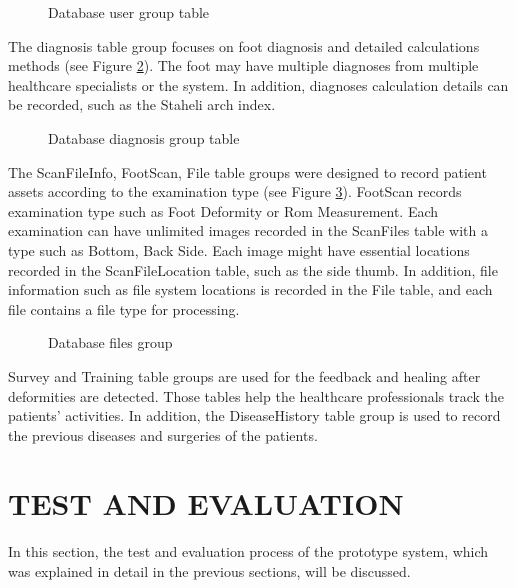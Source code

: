 \begin{figure}[htbp]
\centering
{}
\caption{Database user group table}
\label{fig:DatabaseUser}
\end{figure}

The diagnosis table group focuses on foot diagnosis and detailed calculations methods (see Figure \ref{fig:DatabaseDiagnosis}). The foot may have multiple diagnoses from multiple healthcare specialists or the system. In addition, diagnoses calculation details can be recorded, such as the Staheli arch index.

\begin{figure}[htbp]
\centering
{}
\caption{Database diagnosis group table}
\label{fig:DatabaseDiagnosis}
\end{figure}

The ScanFileInfo, FootScan, File table groups were designed to record patient assets according to the examination type (see Figure \ref{fig:DatabaseFiles}). FootScan records examination type such as Foot Deformity or Rom Measurement. Each examination can have unlimited images recorded in the ScanFiles table with a type such as Bottom, Back Side. Each image might have essential locations recorded in the ScanFileLocation table, such as the side thumb. In addition, file information such as file system locations is recorded in the File table, and each file contains a file type for processing.

\begin{figure}[htbp]
\centering
{}
\caption{Database files group}
\label{fig:DatabaseFiles}
\end{figure}

Survey and Training table groups are used for the feedback and healing after deformities are detected. Those tables help the healthcare professionals track the patients' activities. In addition, the DiseaseHistory table group is used to record the previous diseases and surgeries of the patients.

\section{TEST AND EVALUATION} \label{sec:StudyITestAndEvaluation}

In this section, the test and evaluation process of the prototype system, which was explained in detail in the previous sections, will be discussed.

